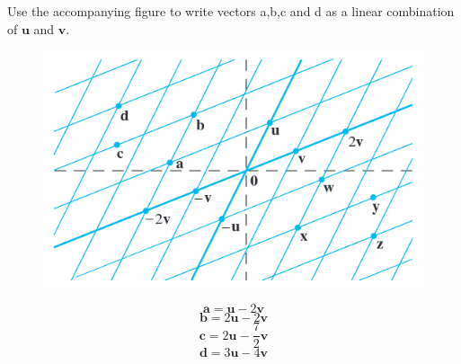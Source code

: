 \documentclass{../mathhomework}
\newcommand{\Vect}[1]{\pmb{#1}}
\begin{document}
\pagebreak
\begin{problem}[1.3\#7]
    Use the accompanying figure to write vectors a,b,c and d as a linear combination of $\Vect{u}$ and $\Vect{v}$.

    \begin{figure}[H]
        \begin{center}
            \includegraphics[width=5in]{figures/1_3_7.png}
        \end{center}
    \end{figure}

    \begin{solution}
        \begin{equation*}
            \Vect{a} = \Vect{u} - 2\Vect{v}
        \end{equation*}
        \begin{equation*}
            \Vect{b} = 2\Vect{u} - 2\Vect{v}
        \end{equation*}
        \begin{equation*}
            \Vect{c} = 2\Vect{u} - \frac{7}{2}\Vect{v}
        \end{equation*}
        \begin{equation*}
            \Vect{d} = 3\Vect{u} - 4\Vect{v}
        \end{equation*}
    \end{solution}
\end{problem}
\end{document}
